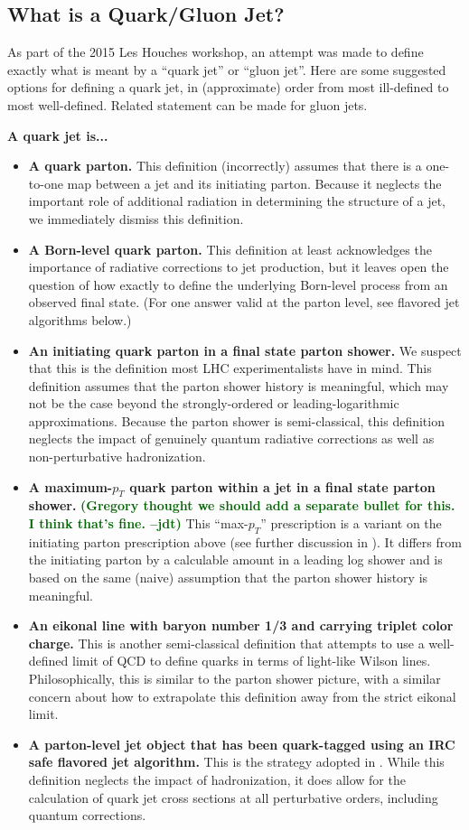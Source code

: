 \documentclass[11pt]{cernrep}
\newcommand{\jdt}[1]{\textbf{\textcolor{darkgreen}{(#1 --jdt)}}}
\begin{document}
\subsection{What is a Quark/Gluon Jet?}
\label{quarkgluon_sec:def}

As part of the 2015 Les Houches workshop, an attempt was made to
define exactly what is meant by a ``quark jet'' or ``gluon jet''.
Here are some suggested options for defining a quark jet, in
(approximate) order from most ill-defined to most well-defined.
Related statement can be made for gluon jets.

\noindent \textbf{A quark jet is...}
\begin{itemize}
\item \textbf{A quark parton.}  This definition (incorrectly) assumes that there is a one-to-one map between a jet and its initiating parton.  Because it neglects the important role of additional radiation in determining the structure of a jet, we immediately dismiss this definition.
\item \textbf{A Born-level quark parton.}  This definition at least acknowledges the importance of radiative corrections to jet production, but it leaves open the question of how exactly to define the underlying Born-level process from an observed final state.  (For one answer valid at the parton level, see flavored jet algorithms below.)
\item \textbf{An initiating quark parton in a final state parton
    shower.}  We suspect that this is the definition most LHC
  experimentalists have in mind.  This definition assumes that the parton shower history is meaningful,
  which may not be the case beyond the strongly-ordered or
  leading-logarithmic approximations.  Because the parton shower is
  semi-classical, this definition neglects the impact of genuinely
  quantum radiative corrections as well as non-perturbative
  hadronization.
\item \textbf{A maximum-$p_T$ quark parton within a jet in a final state parton shower.}  \jdt{Gregory thought we should add a separate bullet for this.  I think that's fine.}  This ``max-$p_T$'' prescription is a variant on the initiating parton prescription above (see further discussion in \cite{Buckley:2015gua}).  It differs from the initiating parton by a calculable amount in a leading log shower \cite{Dasgupta:2014yra} and is based on the same (naive) assumption that the parton shower history is meaningful. 
\item \textbf{An eikonal line with baryon number 1/3 and carrying triplet color charge.}  This is another semi-classical definition that attempts to use a well-defined limit of QCD to define quarks in terms of light-like Wilson lines.  Philosophically, this is similar to the parton shower picture, with a similar concern about how to extrapolate this definition away from the strict eikonal limit.
\item \textbf{A parton-level jet object that has been quark-tagged using an IRC safe flavored jet algorithm.}  This is the strategy adopted in \cite{Banfi:2006hf}.  While this definition neglects the impact of hadronization, it does allow for the calculation of quark jet cross sections at all perturbative orders, including quantum corrections.
\end{itemize}
\end{document}
